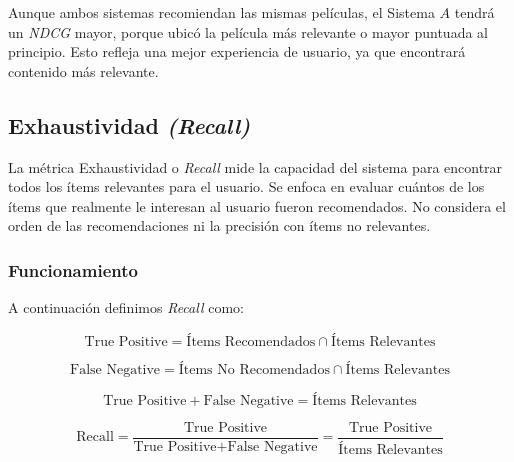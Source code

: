 \documentclass[11pt,a4paper,twoside]{thesis}
\begin{document}
Aunque ambos sistemas recomiendan las mismas películas, el Sistema $A$ tendrá un \textit{NDCG} mayor, porque ubicó la película más relevante o mayor puntuada al principio. Esto refleja una mejor experiencia de usuario, ya que encontrará contenido más relevante.

\subsection{Exhaustividad \textit{(Recall)}}

La métrica Exhaustividad o \textit{Recall} mide la capacidad del sistema para encontrar todos los ítems relevantes para el usuario. Se enfoca en evaluar cuántos de los ítems que realmente le interesan al usuario fueron recomendados. No considera el orden de las recomendaciones ni la precisión con ítems no relevantes.

\subsubsection{Funcionamiento}

A continuación definimos \textit{Recall} como:

\begin{equation}
	\text{True Positive} = \text{Ítems Recomendados} \cap \text{Ítems Relevantes}
	\label{eq:tp}
\end{equation}

\begin{equation}
	\text{False Negative} = \text{Ítems No Recomendados} \cap \text{Ítems Relevantes}
	\label{eq:fn}
\end{equation}

\begin{equation}
	\text{True Positive} + \text{False Negative} = \text{Ítems Relevantes}
	\label{eq:tp_fn}
\end{equation}

\begin{equation}
	\text{Recall} = \frac{\text{True Positive}}{\text{True Positive} + \text{False Negative}} = \frac{\text{True Positive}}{\text{Ítems Relevantes}}
	\label{eq:recall}
\end{equation}
\end{document}
